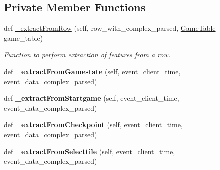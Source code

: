 \subsection*{Private Member Functions}
\begin{DoxyCompactItemize}
\item 
def \mbox{\hyperlink{classfeature__extractors_1_1_lakeland_extractor_1_1_lakeland_extractor_ab6b667d3c3001472e4de2fbf562ecdbc}{\+\_\+extract\+From\+Row}} (self, row\+\_\+with\+\_\+complex\+\_\+parsed, \mbox{\hyperlink{class_game_table_1_1_game_table}{Game\+Table}} game\+\_\+table)
\begin{DoxyCompactList}\small\item\em Function to perform extraction of features from a row. \end{DoxyCompactList}\item 
\mbox{\label{classfeature__extractors_1_1_lakeland_extractor_1_1_lakeland_extractor_ac8316b40850223dd094d734d885dd8e9}} 
def {\bfseries \+\_\+extract\+From\+Gamestate} (self, event\+\_\+client\+\_\+time, event\+\_\+data\+\_\+complex\+\_\+parsed)
\item 
\mbox{\label{classfeature__extractors_1_1_lakeland_extractor_1_1_lakeland_extractor_adc7a5f9742dd808eb9c3801d6f287bd2}} 
def {\bfseries \+\_\+extract\+From\+Startgame} (self, event\+\_\+client\+\_\+time, event\+\_\+data\+\_\+complex\+\_\+parsed)
\item 
\mbox{\label{classfeature__extractors_1_1_lakeland_extractor_1_1_lakeland_extractor_a3772520b60a5b558d5fb7d2de4ac9a6c}} 
def {\bfseries \+\_\+extract\+From\+Checkpoint} (self, event\+\_\+client\+\_\+time, event\+\_\+data\+\_\+complex\+\_\+parsed)
\item 
\mbox{\label{classfeature__extractors_1_1_lakeland_extractor_1_1_lakeland_extractor_a1f3c992e229463292dfda1ccc35570bf}} 
def {\bfseries \+\_\+extract\+From\+Selecttile} (self, event\+\_\+client\+\_\+time, event\+\_\+data\+\_\+complex\+\_\+parsed)
\item 
\mbox{\label{classfeature__extractors_1_1_lakeland_extractor_1_1_lakeland_extractor_a327ffb227e6e696ed44d49603b47b1fa}} 

\end{DoxyCompactItemize}
